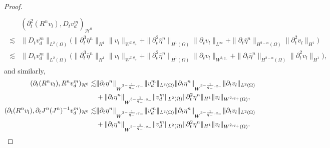 \documentclass[letterpaper,reqno,10pt,twoside]{amsart}
\theoremstyle{definition}
\theoremstyle{remark}
\def\p{\partial}
\begin{document}
\begin{proof}
\begin{align}
		\end{align}
		\begin{align}
			\begin{aligned}
				& (\p_{t}^{2}(R^{n}v_{l}),D_{t}v_{d}^{m})_{\mathcal{H}^{0}}\\
				\lesssim& \|D_{t}v_{d}^{m}\|_{L^{2}(\Omega)}\bigg(\|\p_{t}^{3}\bar{\eta}^{n}\|_{H^{1}}\|v_{l}\|_{W^{2,q_{+}}}+\|\p_{t}^{2}\bar{\eta}^{n}\|_{H^{1}(\Omega)}\|\p_{t}v_{l}\|_{L^{\infty}}+\|\p_{t}\bar{\eta}^{n}\|_{H^{2-\alpha }(\Omega)}\|\p_{t}^{2}v_{l}\|_{H^{1}}\bigg)\\
				\lesssim& \|D_{t}v_{d}^{m}\|_{L^{2}(\Omega)}\bigg(\|\p_{t}^{3}\bar{\eta}^{n}\|_{H^{1}}\|v_{l}\|_{W^{2,q_{+}}}+\|\p_{t}^{2}\bar{\eta}^{n}\|_{H^{1}(\Omega)}\|\p_{t}v_{l}\|_{W^{2,q_{-}}}+\|\p_{t}\bar{\eta}^{n}\|_{H^{2-\alpha }(\Omega)}\|\p_{t}^{2}v_{l}\|_{H^{1}}\bigg),
			\end{aligned}
		\end{align}
		and similarly,
		\begin{align}{\label{est:ep5}}
			\begin{aligned}
				(\p_{t}(R^{n}v_{l}),R^{n}v_{d}^{m})_{\mathcal{H}^{0}}\lesssim& \|\p_{t}\eta^{n}\|_{W^{3-\frac{1}{q_{-}},q_{-}}}\|v_{d}^{m}\|_{L^{2}(\Omega)}\|\p_{t}\eta^{n}\|_{W^{3-\frac{1}{q_{-}},q_{-}}}\|\p_{t}v_{l}\|_{L^{2}(\Omega)}\\
				&+\|\p_{t}\eta^{n}\|_{W^{3-\frac{1}{q_{-}},q_{-}}}\|v_{d}^{m}\|_{L^{2}(\Omega)}\|\p_{t}^{2}\eta^{n}\|_{H^{1}}\|v_{l}\|_{W^{2,q_{+}}(\Omega)},\\
				(\p_{t}(R^{n}v_{l}),\p_{t}J^{n}(J^{n})^{-1}v_{d}^{m})_{\mathcal{H}^{0}}\lesssim& \|\p_{t}\eta^{n}\|_{W^{3-\frac{1}{q_{-}},q_{-}}}\|v_{d}^{m}\|_{L^{2}(\Omega)}\|\p_{t}\eta^{n}\|_{W^{3-\frac{1}{q_{-}},q_{-}}}\|\p_{t}v_{l}\|_{L^{2}(\Omega)}\\
				&+\|\p_{t}\eta^{n}\|_{W^{3-\frac{1}{q_{-}},q_{-}}}\|v_{d}^{m}\|_{L^{2}(\Omega)}\|\p_{t}^{2}\eta^{n}\|_{H^{1}}\|v_{l}\|_{W^{2,q_{+}}(\Omega)}.
			\end{aligned}
		\end{align}
		

\end{proof}
\end{document}
